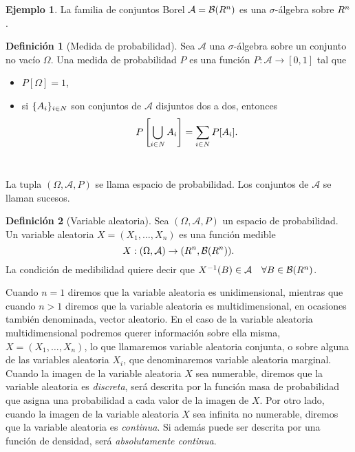 \documentclass[12pt,a4paper]{report} %
\let\mathbb\relax
\theoremstyle{definition}
\newtheorem{definition}{Definición}[section]
\newtheorem{example}[theorem]{Ejemplo}
\begin{document}
\begin{example}
  La familia de conjuntos Borel $\mathcal{A} = \mathcal{B}(\mathbb{R}^n)$ es una $\sigma$-álgebra sobre $\mathbb{R}^n$.\\

\end{example}

\begin{definition}[Medida de probabilidad]
  Sea $\mathcal{A}$ una $\sigma$-álgebra sobre un conjunto no vacío $\Omega$. Una medida de probabilidad $P$ es una función $P:\mathcal{A} \to [0,1]$ tal que
  \begin{itemize}
  \item $P[\Omega] = 1$,
  \item si $\{A_i\}_{i\in \mathbb{N}}$  son conjuntos de $\mathcal{A}$ disjuntos dos a dos, entonces\[
    P\left[\bigcup_{i\in \mathbb{N}}A_i\right] = \sum_{i\in\mathbb{N}}P[A_i].\]\\[-10pt]
  \end{itemize}
\end{definition}

La tupla $(\Omega, \mathcal{A}, P)$ se llama espacio de probabilidad. Los conjuntos de $\mathcal{A}$ se llaman sucesos.\\

\begin{definition}[Variable aleatoria]
    Sea $(\Omega, \mathcal{A}, P)$ un espacio de probabilidad. Un variable aleatoria $X=(X_1,\dots, X_n)$ es una función medible \[
X:(\Omega, \mathcal{A}) \to (\mathbb{R}^n, \mathcal{B}(\mathbb{R}^n)).
\]
La condición de medibilidad quiere decir que $X^{-1}(B) \in \mathcal{A}\quad \forall B\in \mathcal{B}(\mathbb{R}^n)$.\\
\end{definition}

Cuando $n=1$ diremos que la variable aleatoria es unidimensional, mientras que cuando $n >1$ diremos que la variable aleatoria es multidimensional, en ocasiones también denominada, vector aleatorio. En el caso de la variable aleatoria multidimensional podremos querer información sobre ella misma, $X=(X_1,\dots, X_n)$, lo que llamaremos variable aleatoria conjunta, o sobre alguna de las variables aleatoria $X_i$, que denominaremos variable aleatoria marginal.\\

Cuando la imagen de la variable aleatoria $X$ sea numerable, diremos que la variable aleatoria es \textit{discreta}, será descrita por la función masa de probabilidad que asigna una probabilidad a cada valor de la imagen de $X$. Por otro lado, cuando la imagen de la variable aleatoria $X$ sea infinita no numerable, diremos que la variable aleatoria es \textit{continua}. Si además puede ser descrita por una función de densidad, será \textit{absolutamente continua}.\\
\end{document}
